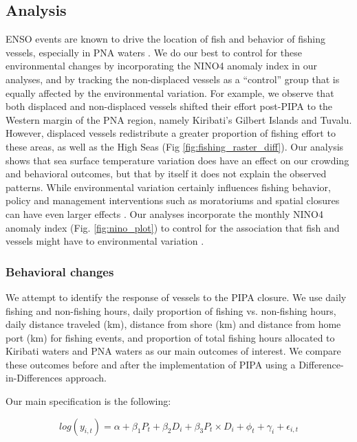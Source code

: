 \documentclass[12pt]{article}
\begin{document}
\subsection{Analysis}

ENSO events are known to drive the location of fish and behavior of fishing vessels, especially in PNA waters \cite{lehodey_1997,kroodsma_2018,aqorau_2018}. We do our best to control for these environmental changes by incorporating the NINO4 anomaly index in our analyses, and by tracking the non-displaced vessels as a ``control'' group that is equally affected by the environmental variation. For example, we observe that both displaced and non-displaced vessels shifted their effort post-PIPA to the Western margin of the PNA region, namely Kiribati's Gilbert Islands and Tuvalu. However, displaced vessels redistribute a greater proportion of fishing effort to these areas, as well as the High Seas (Fig \ref{fig:fishing_raster_diff}). Our analysis shows that sea surface temperature variation does have an effect on our crowding and behavioral outcomes, but that by itself it does not explain the observed patterns. While environmental variation certainly influences fishing behavior, policy and management interventions such as moratoriums and spatial closures can have even larger effects \cite{kroodsma_2018}.  Our analyses incorporate the monthly NINO4 anomaly index (Fig. \ref{fig:nino_plot}) to control for the association that fish and vessels might have to environmental variation \cite{lehodey_1997,kroodsma_2018,aqorau_2018}.

\subsubsection{Behavioral changes}

We attempt to identify the response of vessels to the PIPA closure. We use daily fishing and non-fishing hours, daily proportion of fishing vs. non-fishing hours, daily distance traveled (km), distance from shore (km) and distance from home port (km) for fishing events, and proportion of total fishing hours allocated to Kiribati waters and PNA waters as our main outcomes of interest. We compare these outcomes before and after the implementation of PIPA using a Difference-in-Differences approach.

Our main specification is the following:

$$
log(y_{i,t}) = \alpha + \beta_1 P_t + \beta_2 D_i + \beta_3 P_t \times D_i + \phi_t + \gamma_i + \epsilon_{i,t}
\label{eqn:did}
$$
\end{document}
